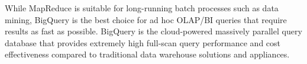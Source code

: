 \documentclass[twocolumn]{article}
\begin{document}
While MapReduce is suitable for long-running batch processes such as data mining, BigQuery is the best choice for ad hoc OLAP/BI queries that require results as fast as possible. BigQuery is the cloud-powered massively parallel query database that provides extremely high full-scan query performance and cost effectiveness compared to traditional data warehouse solutions and appliances.



\end{document}
